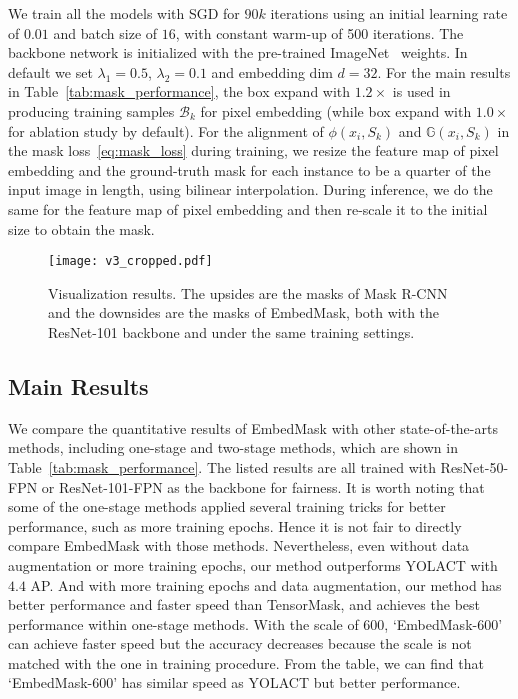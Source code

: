 \documentclass[10pt,twocolumn,letterpaper]{article}
\begin{document}
\medbreak
{}
We train all the models with SGD for $90k$ iterations using an initial learning rate of $0.01$ and batch size of $16$, with constant warm-up of 500 iterations. 
The backbone network is initialized with the pre-trained ImageNet~\cite{deng2009imagenet} weights. 
In default we set $\lambda_1=0.5$, $\lambda_2=0.1$ and embedding dim $d=32$. 
For the main results in Table~\ref{tab:mask_performance}, the box expand with $1.2\times$ is used in producing training samples $\mathcal{B}_k$ for pixel embedding (while box expand with $1.0\times$ for ablation study by default).
For the alignment of $\phi{\left(x_i, S_k\right)}$ and $\mathbb{G}(x_i, S_k)$ in the mask loss~\ref{eq:mask_loss} during training, we resize the feature map of pixel embedding and the ground-truth mask for each instance to be a quarter of the input image in length, using  bilinear interpolation. 
During inference, we do the same for the feature map of pixel embedding and then re-scale it to the initial size to obtain the mask.

\begin{figure*}
   \begin{center}
      \texttt{[image: v3\_cropped.pdf]}
   \end{center}\vspace{-0.1in}
      \caption{Visualization results. The upsides are the masks of Mask R-CNN and the downsides are the masks of EmbedMask, both with the ResNet-101 backbone and under the same training settings.}
   \label{fig:vis}
\end{figure*}

\subsection{Main Results}

\medbreak
{}
We compare the quantitative results of EmbedMask with other state-of-the-arts methods, including one-stage and two-stage methods, which are shown in Table~\ref{tab:mask_performance}. 
The listed results are all trained with ResNet-50-FPN or ResNet-101-FPN as the backbone for fairness. 
It is worth noting that some of the one-stage methods applied several training tricks for better performance, such as more training epochs. 
Hence it is not fair to directly compare EmbedMask with those methods. 
Nevertheless, even without data augmentation or more training epochs, our method outperforms YOLACT with $4.4$ AP. 
And with more training epochs and data augmentation, our method has better performance and faster speed than TensorMask, and achieves the best performance within one-stage methods. 
With the scale of 600, `EmbedMask-600' can achieve faster speed but the accuracy decreases because the scale is not matched with the one in training procedure. 
From the table, we can find that `EmbedMask-600' has similar speed as YOLACT but better performance. 
\end{document}
